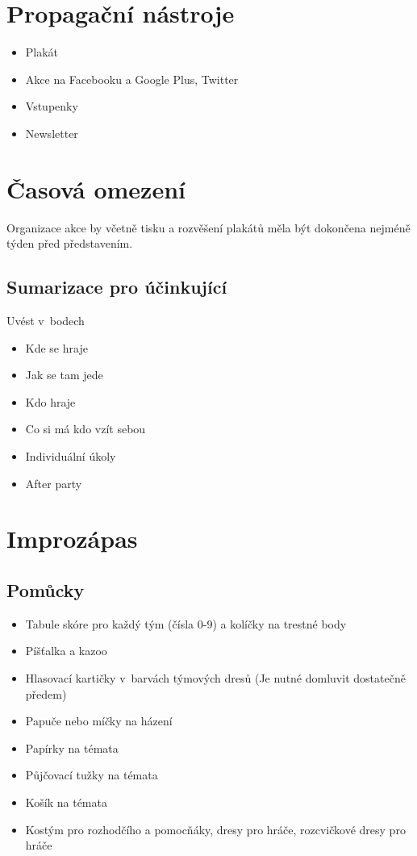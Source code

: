 \section{Propagační nástroje} \begin{itemize}
\item Plakát
\item Akce na Facebooku a Google Plus, Twitter
\item Vstupenky
\item Newsletter
\end{itemize}
 
\section{Časová omezení} Organizace akce by včetně tisku a rozvěšení plakátů měla být dokončena nejméně týden před představením. 
\subsection{Sumarizace pro účinkující} Uvést v~bodech 
\begin{itemize}
\item Kde se hraje
\item Jak se tam jede
\item Kdo hraje
\item Co si má kdo vzít sebou
\item Individuální úkoly
\item After party
\end{itemize}
\section{Improzápas} \subsection{Pomůcky} \begin{itemize}
\item Tabule skóre pro každý tým (čísla 0-9) a kolíčky na trestné body
\item Píšťalka a kazoo
\item Hlasovací kartičky v~barvách týmových dresů (Je nutné domluvit dostatečně předem)
\item Papuče nebo míčky na házení
\item Papírky na témata
\item Půjčovací tužky na témata
\item Košík na témata
\item Kostým pro rozhodčího a pomocňáky, dresy pro hráče, rozcvičkové dresy pro hráče
\end{itemize}
